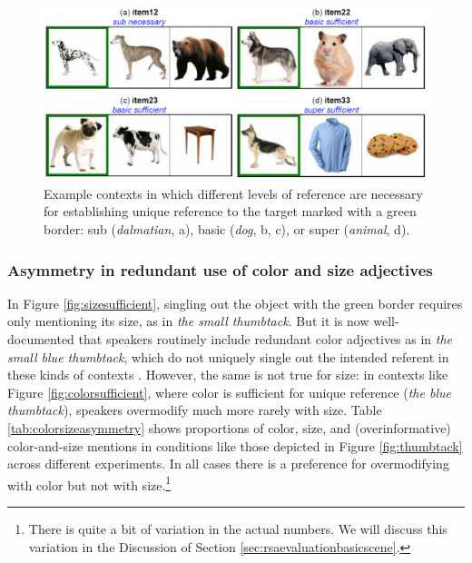 \documentclass[11pt]{article}
\newcommand{\tableref}[1]{Table \ref{#1}}
\newcommand{\figref}[1]{Figure \ref{#1}}
\newcommand{\sectionref}[1]{Section \ref{#1}}
\begin{document}
\begin{figure}
\includegraphics[width=\textwidth]{pics/design}
\caption{Example contexts in which different levels of reference are necessary for establishing unique reference to the target marked with a green border: sub (\emph{dalmatian}, a), basic (\emph{dog}, b, c), or super (\emph{animal}, d).}
\label{fig:dogcontexts}
\end{figure}

\subsubsection{Asymmetry in redundant use of color and size adjectives}
\label{sec:asymmetry}

 In \figref{fig:sizesufficient}, singling out the object with the green border requires only mentioning its size, as in \emph{the small thumbtack}. But it is now well-documented that speakers routinely include redundant color adjectives as in \emph{the small blue thumbtack}, which do not uniquely single out the intended referent in these kinds of contexts \cite{Pechmann1989,  Belke2002, gatt2011}. However, the same is not true for size: in contexts like \figref{fig:colorsufficient}, where color is sufficient for unique reference (\emph{the blue thumbtack}), speakers overmodify much more rarely with size. \tableref{tab:colorsizeasymmetry} shows proportions of color, size, and (overinformative) color-and-size mentions in conditions like those depicted in \figref{fig:thumbtack} across different experiments. In all cases there is a preference for overmodifying with color but not with size.\footnote{There is quite a bit of variation in the actual numbers. We will discuss this variation in the Discussion of  \sectionref{sec:rsaevaluationbasicscene}.}
 
\end{document}

